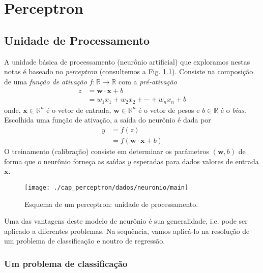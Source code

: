 
\chapter{Perceptron}\label{cap_perceptron}
\thispagestyle{fancy}


\section{Unidade de Processamento}

A unidade básica de processamento (neurônio artificial) que exploramos nestas notas é baseado no \emph{perceptron} (consultemos a Fig. \ref{fig:perceptron}). Consiste na composição de uma \emph{função de ativação} $f:\mathbb{R}\to\mathbb{R}$ com a \emph{pré-ativação}
\begin{align}
  z &= \pmb{w}\cdot\pmb{x} + b\\
    &= w_1x_1 + w_2x_2 + \cdots + w_nx_n + b
\end{align}
onde, $\pmb{x}\in\mathbb{R}^{n}$ é o vetor de entrada, $\pmb{w}\in\mathbb{R}^{n}$ é o vetor de pesos e $b\in\mathbb{R}$ é o {\it bias}. Escolhida uma função de ativação, a saída do neurônio é dada por
\begin{align}
  y &= f(z)\\
    &= f(\pmb{w}\cdot\pmb{x} + b)
\end{align}
O treinamento (calibração) consiste em determinar os parâmetros $(\pmb{w}, b)$ de forma que o neurônio forneça as saídas $y$ esperadas para dados valores de entrada $\pmb{x}$.

\begin{figure}[H]
  \centering
  \texttt{[image: ./cap\_perceptron/dados/neuronio/main]}
  \caption{Esquema de um perceptron: unidade de processamento.}
  \label{fig:perceptron}
\end{figure}

Uma das vantagens deste modelo de neurônio é sua generalidade, i.e. pode ser aplicado a diferentes problemas. Na sequência, vamos aplicá-lo na resolução de um problema de classificação e noutro de regressão.


\subsection{Um problema de classificação}

